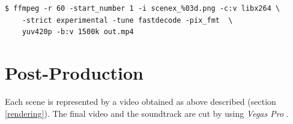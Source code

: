 \begin{lstlisting}
$ ffmpeg -r 60 -start_number 1 -i scenex_%03d.png -c:v libx264 \
	-strict experimental -tune fastdecode -pix_fmt  \
	yuv420p -b:v 1500k out.mp4

\end{lstlisting}

\section{Post-Production}
Each scene is represented by a video obtained as above described (section \ref{rendering}). The final video and the soundtrack are cut by using \textit{Vegas Pro} \cite{VegasPro}. 



